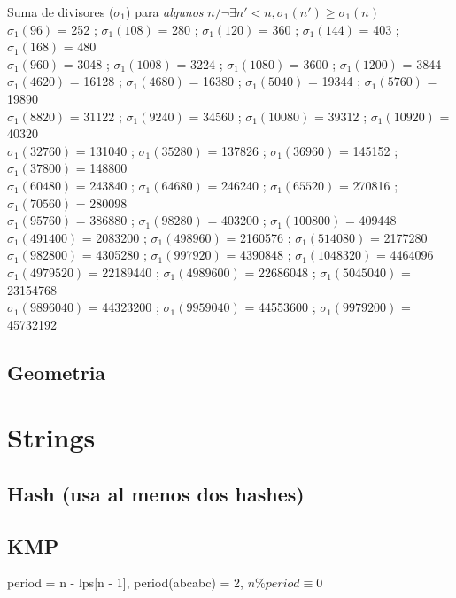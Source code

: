 %
Suma de divisores ($\sigma_1$) para \emph{algunos} $n / \neg\exists n'<n, \sigma_1(n') \geqslant \sigma_1(n)$ \\
$\sigma_1(96)$ = 252 ; $\sigma_1(108)$ = 280 ; $\sigma_1(120)$ = 360 ; $\sigma_1(144)$ = 403 ; $\sigma_1(168)$ = 480 \\
$\sigma_1(960)$ = 3048 ; $\sigma_1(1008)$ = 3224 ; $\sigma_1(1080)$ = 3600 ; $\sigma_1(1200)$ = 3844 \\
$\sigma_1(4620)$ = 16128 ; $\sigma_1(4680)$ = 16380 ; $\sigma_1(5040)$ = 19344 ; $\sigma_1(5760)$ = 19890 \\
$\sigma_1(8820)$ = 31122 ; $\sigma_1(9240)$ = 34560 ; $\sigma_1(10080)$ = 39312 ; $\sigma_1(10920)$ = 40320 \\
$\sigma_1(32760)$ = 131040 ; $\sigma_1(35280)$ = 137826 ; $\sigma_1(36960)$ = 145152 ; $\sigma_1(37800)$ = 148800 \\
$\sigma_1(60480)$ = 243840 ; $\sigma_1(64680)$ = 246240 ; $\sigma_1(65520)$ = 270816 ; $\sigma_1(70560)$ = 280098 \\
$\sigma_1(95760)$ = 386880 ; $\sigma_1(98280)$ = 403200 ; $\sigma_1(100800)$ = 409448  \\
$\sigma_1(491400)$ = 2083200 ; $\sigma_1(498960)$ = 2160576 ; $\sigma_1(514080)$ = 2177280 \\
$\sigma_1(982800)$ = 4305280 ; $\sigma_1(997920)$ = 4390848 ; $\sigma_1(1048320)$ = 4464096 \\
$\sigma_1(4979520)$ = 22189440 ; $\sigma_1(4989600)$ = 22686048 ; $\sigma_1(5045040)$ = 23154768 \\
$\sigma_1(9896040)$ = 44323200 ; $\sigma_1(9959040)$ = 44553600 ; $\sigma_1(9979200)$ = 45732192
%
%


\subsection{Geometria}


\section{Strings}
\subsection{Hash (usa al menos dos hashes)}

\newpage
\subsection{KMP}
period = n - lps[n - 1], period(abcabc) = 2, $n \% period \equiv 0$
